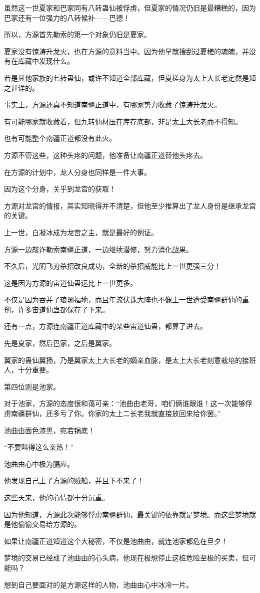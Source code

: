 \begin{this_body}
虽然这一世夏家和巴家同有八转蛊仙被俘虏，但夏家的情况仍旧是最糟糕的，因为巴家还有一位强力的八转候补——巴德！

所以，方源首先勒索的第一个对象仍旧是夏家。

夏家没有惊涛升龙火，也在方源的意料当中。因为他早就搜刮过夏槎的魂魄，并没有在库藏中发现什么。

若是其他家族的七转蛊仙，或许不知道全部库藏，但夏槎身为太上大长老定然是知之甚详的。

事实上，方源还真不知道南疆正道中，有哪家势力收藏了惊涛升龙火。

有可能哪家就收藏着，但九转仙材压在库存底部，非是太上大长老而不得知。

也有可能整个南疆正道都没有此火。

方源不管这些，这种头疼的问题，他准备让南疆正道替他头疼去。

在方源的计划中，龙人分身也同样是一件大事。

因为这个分身，关乎到龙宫的获取！

方源对龙宫的情报，其实知晓得并不清楚，但他至少推算出了龙人身份是继承龙宫的关键。

上一世，白凝冰成为龙宫之主，就是最好的例证。

方源一边敲诈勒索南疆正道，一边继续潜修，努力消化战果。

不久后，光阴飞刃杀招改良成功，全新的杀招威能比上一世更强三分！

这是因为方源的宙道仙蛊远比上一世更多。

不仅是因为吞并了琅琊福地，而且年流伏诛大阵也不像上一世遭受南疆群仙的重创，许多宙道仙蛊都保存了下来。

还有一点，方源连南疆正道库藏中的某些宙道仙蛊，都算了进去。

先是夏家，然后巴家，之后是翼家。

翼家的蛊仙翼扬，乃是翼家太上大长老的嫡亲血脉，是太上大长老刻意栽培的接班人，十分重要。

第四位则是池家。

对于池家，方源的态度很和蔼可亲：“池曲由老哥，咱们俩谁跟谁！这一次能够俘虏南疆群仙，还多亏了你。你家的太上二长老我就直接放回来给你罢。”

池曲由面色漆黑，宛若锅底！

“不要叫得这么亲热！”

池曲由心中极为膈应。

他发现自己上了方源的贼船，并且下不来了！

这些天来，他的心情都十分沉重。

因为他知道，方源此次能够俘虏南疆群仙，最关键的依靠就是梦境。而这些梦境就是他偷偷交易给方源的。

如果让南疆正道知道这个大秘密，不仅是池曲由，就连池家都危在旦夕！

梦境的交易已经成了池曲由的心头病，他现在极想停止这桩危险至极的买卖，但可能吗？

想到自己要面对的是方源这样的人物，池曲由心中冰冷一片。

\end{this_body}

